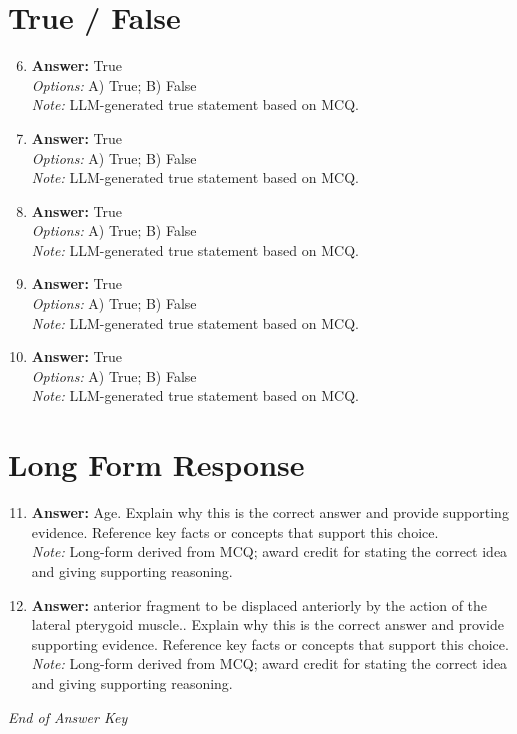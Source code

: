 \documentclass[12pt]{article}
\begin{document}
\section*{True / False}
\begin{enumerate}[label=\arabic*.]
\setcounter{enumi}{5}
\item \textbf{Answer:} True
\\ \textit{Options:} A) True; B) False
\\ \textit{Note:} LLM-generated true statement based on MCQ.
\item \textbf{Answer:} True
\\ \textit{Options:} A) True; B) False
\\ \textit{Note:} LLM-generated true statement based on MCQ.
\item \textbf{Answer:} True
\\ \textit{Options:} A) True; B) False
\\ \textit{Note:} LLM-generated true statement based on MCQ.
\item \textbf{Answer:} True
\\ \textit{Options:} A) True; B) False
\\ \textit{Note:} LLM-generated true statement based on MCQ.
\item \textbf{Answer:} True
\\ \textit{Options:} A) True; B) False
\\ \textit{Note:} LLM-generated true statement based on MCQ.
\end{enumerate}

\section*{Long Form Response}
\begin{enumerate}[label=\arabic*.]
\setcounter{enumi}{10}
\item \textbf{Answer:} Age. Explain why this is the correct answer and provide supporting evidence. Reference key facts or concepts that support this choice.
\\ \textit{Note:} Long-form derived from MCQ; award credit for stating the correct idea and giving supporting reasoning.
\item \textbf{Answer:} anterior fragment to be displaced anteriorly by the action of the lateral pterygoid muscle.. Explain why this is the correct answer and provide supporting evidence. Reference key facts or concepts that support this choice.
\\ \textit{Note:} Long-form derived from MCQ; award credit for stating the correct idea and giving supporting reasoning.
\end{enumerate}

\vfill
\noindent\textit{End of Answer Key}
\end{document}
